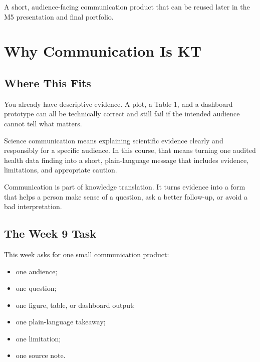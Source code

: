 \documentclass[
  letterpaper,
  DIV=11,
  numbers=noendperiod,
  oneside]{scrreprt}
\providecommand{\tightlist}{%
  \setlength{\itemsep}{0pt}\setlength{\parskip}{0pt}}
\begin{document}

A short, audience-facing communication product that can be reused later
in the M5 presentation and final portfolio.

\chapter*{Why Communication Is KT}\label{why-communication-is-kt}


\section*{Where This Fits}\label{where-this-fits-18}


You already have descriptive evidence. A plot, a Table 1, and a
dashboard prototype can all be technically correct and still fail if the
intended audience cannot tell what matters.

Science communication means explaining scientific evidence clearly and
responsibly for a specific audience. In this course, that means turning
one audited health data finding into a short, plain-language message
that includes evidence, limitations, and appropriate caution.

Communication is part of knowledge translation. It turns evidence into a
form that helps a person make sense of a question, ask a better
follow-up, or avoid a bad interpretation.

\section*{The Week 9 Task}\label{the-week-9-task}


This week asks for one small communication product:

\begin{itemize}
\tightlist
\item
  one audience;
\item
  one question;
\item
  one figure, table, or dashboard output;
\item
  one plain-language takeaway;
\item
  one limitation;
\item
  one source note.
\end{itemize}
\end{document}
